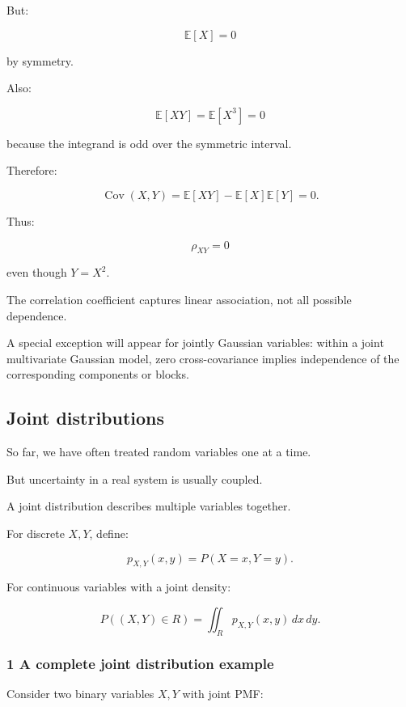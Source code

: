 But:

\[
 \mathbb E[X]=0
\]

by symmetry.

Also:

\[
 \mathbb E[XY] = \mathbb E[X^3]=0
\]

because the integrand is odd over the symmetric interval.

Therefore:

\[
 \operatorname{Cov}(X,Y) = \mathbb E[XY]-\mathbb E[X]\mathbb E[Y] =0.
\]

Thus:

\[
 \boxed{\rho_{XY}=0}
\]

even though \(Y=X^2\).

The correlation coefficient captures linear association, not all possible dependence.

A special exception will appear for jointly Gaussian variables: within a joint multivariate Gaussian model, zero cross-covariance implies independence of the corresponding components or blocks.

\subsection{Joint distributions}\label{02-foundations-ii-ch023-joint-distributions}

\hypertarget{02-foundations-ii-ch023-joint-distributions}{}

So far, we have often treated random variables one at a time.

But uncertainty in a real system is usually coupled.

A joint distribution describes multiple variables together.

For discrete \(X,Y\), define:

\[
 \boxed{ p_{X,Y}(x,y)=P(X=x,Y=y) }.
\]

For continuous variables with a joint density:

\[
 \boxed{ P((X,Y)\in R) = \iint_Rp_{X,Y}(x,y)\,dx\,dy }.
\]

\subsubsection{1 A complete joint distribution example}\label{02-foundations-ii-ch023-a-complete-joint-distribution-example}

\hypertarget{02-foundations-ii-ch023-a-complete-joint-distribution-example}{}

Consider two binary variables \(X,Y\) with joint PMF:

